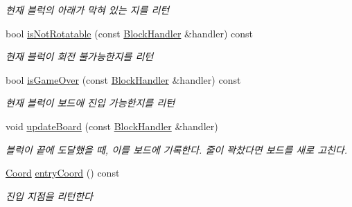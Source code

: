 \begin{DoxyCompactItemize}
\begin{DoxyCompactList}\small\item\em 현재 블럭의 아래가 막혀 있는 지를 리턴 \end{DoxyCompactList}\item 
bool \mbox{\hyperlink{class_board_a4b84310dd1ac3a08a3180361508a43e3}{is\+Not\+Rotatable}} (const \mbox{\hyperlink{class_block_handler}{Block\+Handler}} \&handler) const
\begin{DoxyCompactList}\small\item\em 현재 블럭이 회전 불가능한지를 리턴 \end{DoxyCompactList}\item 
bool \mbox{\hyperlink{class_board_a538ca2c02fbccf3af07ed3c821d9a736}{is\+Game\+Over}} (const \mbox{\hyperlink{class_block_handler}{Block\+Handler}} \&handler) const
\begin{DoxyCompactList}\small\item\em 현재 블럭이 보드에 진입 가능한지를 리턴 \end{DoxyCompactList}\item 
void \mbox{\hyperlink{class_board_a06e5188ef352fc5c0e3957895cef6a89}{update\+Board}} (const \mbox{\hyperlink{class_block_handler}{Block\+Handler}} \&handler)
\begin{DoxyCompactList}\small\item\em 블럭이 끝에 도달했을 때, 이를 보드에 기록한다. 줄이 꽉찼다면 보드를 새로 고친다. \end{DoxyCompactList}\item 
\mbox{\hyperlink{struct_coord}{Coord}} \mbox{\hyperlink{class_board_a902cd3b288be772ba6b7abc6a822afea}{entry\+Coord}} () const
\begin{DoxyCompactList}\small\item\em 진입 지점을 리턴한다 \end{DoxyCompactList}\end{DoxyCompactItemize}
